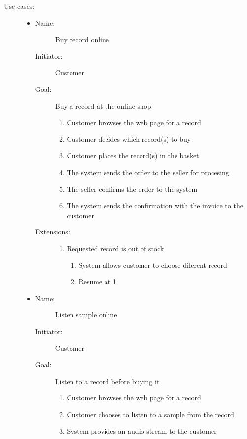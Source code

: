 \documentclass[12pt, titlepage]{article}
\begin{document}
\begin{description}
    \item[Use cases:] \hfil
    \begin{itemize}
    \item
        \begin{description}
            \item[Name:]Buy record online 
            \item[Initiator:]Customer
            \item[Goal:]Buy a record at the online shop 
            \begin{enumerate}
                \item Customer browses the web page for a record
                \item Customer decides which record(s) to buy
                \item Customer places the record(s) in the basket
                \item The system sends the order to the seller for procesing
                \item The seller confirms the order to the system
                \item The system sends the confirmation with the invoice to the customer
            \end{enumerate}
            \item[Extensions:] \hfil
            \begin{enumerate}
                \item Requested record is out of stock
                \begin{enumerate}
                    \item System allows customer to choose diferent record
                    \item Resume at 1
                \end{enumerate}
            \end{enumerate}
        \end{description}

    \item
        \begin{description}
            \item[Name:]Listen sample online 
            \item[Initiator:]Customer
            \item[Goal:]Listen to a record before buying it
            \begin{enumerate}
                \item Customer browses the web page for a record
                \item Customer chooses to listen to a sample from the record
                \item System provides an audio stream to the customer
            \end{enumerate}
        \end{description}


\end{itemize}
\end{description}
\end{document}
